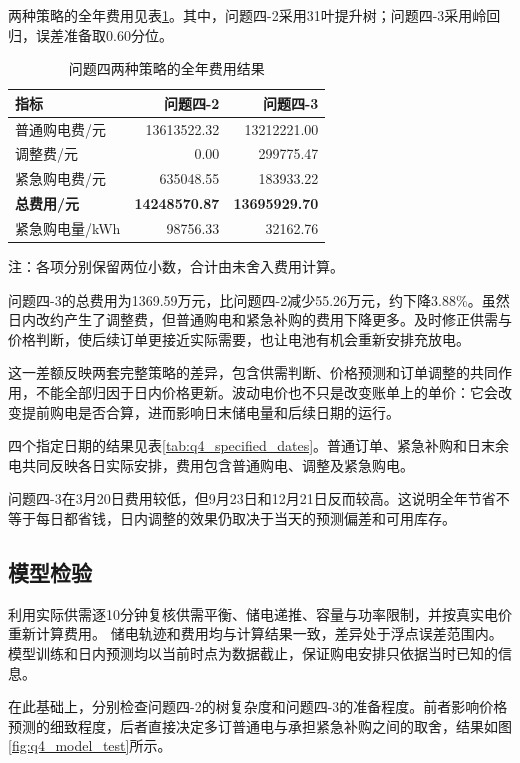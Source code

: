 两种策略的全年费用见表\ref{tab:q4_final_results}。其中，问题四-2采用31叶提升树；问题四-3采用岭回归，误差准备取0.60分位。

\begin{table}[H]
    \centering
    \caption{问题四两种策略的全年费用结果}
    \label{tab:q4_final_results}
    \begin{tabular}{lrr}
        \hline
        指标 & 问题四-2 & 问题四-3 \\
        \hline
        普通购电费/元 & 13613522.32 & 13212221.00 \\
        调整费/元 & 0.00 & 299775.47 \\
        紧急购电费/元 & 635048.55 & 183933.22 \\
        \textbf{总费用/元} & \textbf{14248570.87} & \textbf{13695929.70} \\
        紧急购电量/kWh & 98756.33 & 32162.76 \\
        \hline
    \end{tabular}
\par\smallskip
{\small 注：各项分别保留两位小数，合计由未舍入费用计算。}
\end{table}

问题四-3的总费用为1369.59万元，比问题四-2减少55.26万元，约下降3.88\%。虽然日内改约产生了调整费，但普通购电和紧急补购的费用下降更多。及时修正供需与价格判断，使后续订单更接近实际需要，也让电池有机会重新安排充放电。

这一差额反映两套完整策略的差异，包含供需判断、价格预测和订单调整的共同作用，不能全部归因于日内价格更新。波动电价也不只是改变账单上的单价：它会改变提前购电是否合算，进而影响日末储电量和后续日期的运行。

四个指定日期的结果见表\ref{tab:q4_specified_dates}。普通订单、紧急补购和日末余电共同反映各日实际安排，费用包含普通购电、调整及紧急购电。

问题四-3在3月20日费用较低，但9月23日和12月21日反而较高。这说明全年节省不等于每日都省钱，日内调整的效果仍取决于当天的预测偏差和可用库存。

\subsection{模型检验}

利用实际供需逐10分钟复核供需平衡、储电递推、容量与功率限制，并按真实电价重新计算费用。
储电轨迹和费用均与计算结果一致，差异处于浮点误差范围内。
模型训练和日内预测均以当前时点为数据截止，保证购电安排只依据当时已知的信息。

在此基础上，分别检查问题四-2的树复杂度和问题四-3的准备程度。前者影响价格预测的细致程度，后者直接决定多订普通电与承担紧急补购之间的取舍，结果如图\ref{fig:q4_model_test}所示。

